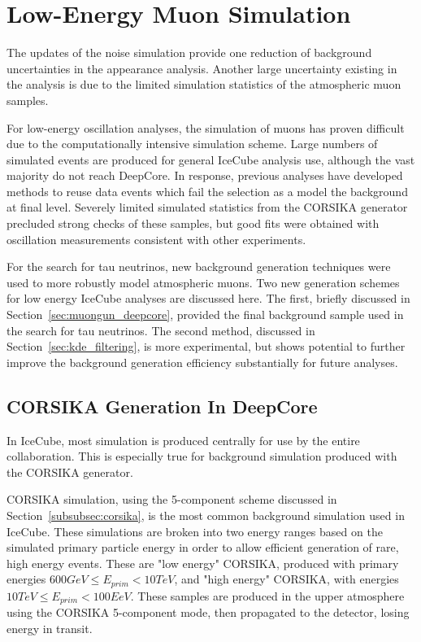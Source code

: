 \chapter{Low-Energy Muon Simulation}
The updates of the noise simulation provide one reduction of background uncertainties in the appearance analysis.
Another large uncertainty existing in the analysis is due to the limited simulation statistics of the atmospheric muon samples.

For low-energy oscillation analyses, the simulation of muons has proven difficult due to the computationally intensive simulation scheme.
Large numbers of simulated events are produced for general IceCube analysis use, although the vast majority do not reach DeepCore.
In response, previous analyses \cite{IceCube-Oscillation2013,IceCube-Oscillation2015,IceCube-Oscillation2018,IceCubeSterile-Andrii} have developed methods to reuse data events which fail the selection as a model the background at final level.
Severely limited simulated statistics from the CORSIKA generator precluded strong checks of these samples, but good fits were obtained with oscillation measurements consistent with other experiments.

For the search for tau neutrinos, new background generation techniques were used to more robustly model atmospheric muons.
Two new generation schemes for low energy IceCube analyses are discussed here.
The first, briefly discussed in Section~\ref{sec:muongun_deepcore}, provided the final background sample used in the search for tau neutrinos.
The second method, discussed in Section~\ref{sec:kde_filtering}, is more experimental, but shows potential to further improve the background generation efficiency substantially for future analyses.

\label{sec:corsika_problems}
\section{CORSIKA Generation In DeepCore}
In IceCube, most simulation is produced centrally for use by the entire collaboration.
This is especially true for background simulation produced with the CORSIKA generator.

CORSIKA simulation, using the 5-component scheme discussed in Section~\ref{subsubsec:corsika}, is the most common background simulation used in IceCube.
These simulations are broken into two energy ranges based on the simulated primary particle energy in order to allow efficient generation of rare, high energy events.
These are "low energy" CORSIKA, produced with primary energies $600 GeV \leq E_{prim} < 10 TeV$, and "high energy" CORSIKA, with energies $10 TeV \leq E_{prim} < 100 EeV$.
These samples are produced in the upper atmosphere using the CORSIKA 5-component mode, then propagated to the detector, losing energy in transit.

